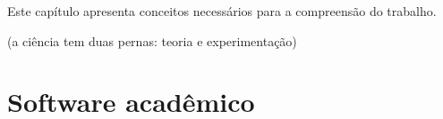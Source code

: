 

{Este capítulo apresenta conceitos necessários para a compreensão do trabalho.}
\label{fundamentacao}

(a ciência tem duas pernas: teoria e experimentação)

%

\section{Software acadêmico}



%
%

